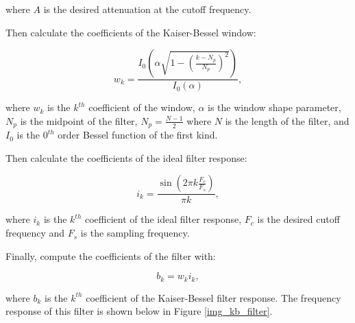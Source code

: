                 where $A$ is the desired attenuation at the cutoff frequency.

                Then calculate the coefficients of the Kaiser-Bessel window:

                \begin{equation}
                w_k = \frac{I_0(\alpha \sqrt{1 - (\frac{k - N_p}{N_p})^2})}{I_0(\alpha)},
                \end{equation}

                where $w_k$ is the $k^{th}$ coefficient of the window, $\alpha$ is the window shape parameter, $N_p$ is the midpoint of the filter, $N_p = \frac{N-1}{2}$ where $N$ is the length of the filter, and $I_0$ is the $0^{th}$ order Bessel function of the first kind.

                Then calculate the coefficients of the ideal filter response:

                \begin{equation}
                i_k = \frac{\sin(2\pi k\frac{F_c}{F_s})}{\pi k},
                \end{equation}

                where $i_k$ is the $k^{th}$ coefficient of the ideal filter response, $F_c$ is the desired cutoff frequency and $F_s$ is the sampling frequency.

                Finally, compute the coefficients of the filter with: 

                \begin{equation}
                b_k = w_ki_k,
                \end{equation}

                where $b_k$ is the $k^{th}$ coefficient of the Kaiser-Bessel filter response. The frequency response of this filter is shown below in Figure \ref{img_kb_filter}.


